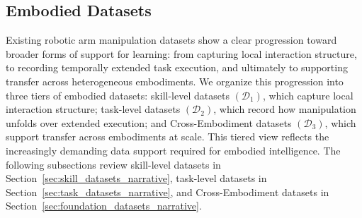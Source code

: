 \documentclass[acmsmall,screen,review]{acmart}
\begin{document}
\subsection{Embodied Datasets}\label{sec:eai_datasets}

Existing robotic arm manipulation datasets show a clear progression toward broader forms of support for learning: from capturing local interaction structure, to recording temporally extended task execution, and ultimately to supporting transfer across heterogeneous embodiments.
We organize this progression into three tiers of embodied datasets: skill-level datasets \((\mathcal{D}_1)\), which capture local interaction structure; task-level datasets \((\mathcal{D}_2)\), which record how manipulation unfolds over extended execution; and Cross-Embodiment datasets \((\mathcal{D}_3)\), which support transfer across embodiments at scale.
This tiered view reflects the increasingly demanding data support required for embodied intelligence.
The following subsections review skill-level datasets in Section~\ref{sec:skill_datasets_narrative}, task-level datasets in Section~\ref{sec:task_datasets_narrative}, and Cross-Embodiment datasets in Section~\ref{sec:foundation_datasets_narrative}.
\end{document}

